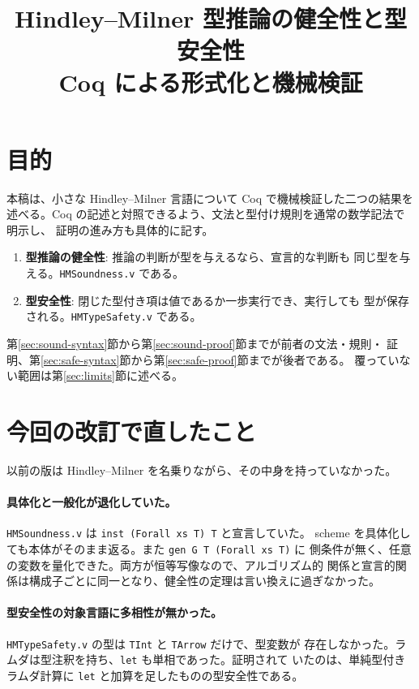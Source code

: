 \documentclass[11pt,a4paper]{ltjsarticle}
\title{Hindley--Milner 型推論の健全性と型安全性\\\large Coq による形式化と機械検証}
\author{}
\date{}
\begin{document}
\maketitle

\section{目的}

本稿は、小さな Hindley--Milner 言語について Coq で機械検証した二つの結果を
述べる。Coq の記述と対照できるよう、文法と型付け規則を通常の数学記法で明示し、
証明の進み方も具体的に記す。

\begin{enumerate}
  \item \textbf{型推論の健全性}: 推論の判断が型を与えるなら、宣言的な判断も
  同じ型を与える。\texttt{HMSoundness.v} である。
  \item \textbf{型安全性}: 閉じた型付き項は値であるか一歩実行でき、実行しても
  型が保存される。\texttt{HMTypeSafety.v} である。
\end{enumerate}

第\ref{sec:sound-syntax}節から第\ref{sec:sound-proof}節までが前者の文法・規則・
証明、第\ref{sec:safe-syntax}節から第\ref{sec:safe-proof}節までが後者である。
覆っていない範囲は第\ref{sec:limits}節に述べる。

\section{今回の改訂で直したこと}

以前の版は Hindley--Milner を名乗りながら、その中身を持っていなかった。

\paragraph{具体化と一般化が退化していた。}
\texttt{HMSoundness.v} は \texttt{inst (Forall xs T) T} と宣言していた。
scheme を具体化しても本体がそのまま返る。また \texttt{gen G T (Forall xs T)} に
側条件が無く、任意の変数を量化できた。両方が恒等写像なので、アルゴリズム的
関係と宣言的関係は構成子ごとに同一となり、健全性の定理は言い換えに過ぎなかった。

\paragraph{型安全性の対象言語に多相性が無かった。}
\texttt{HMTypeSafety.v} の型は \texttt{TInt} と \texttt{TArrow} だけで、型変数が
存在しなかった。ラムダは型注釈を持ち、\texttt{let} も単相であった。証明されて
いたのは、単純型付きラムダ計算に \texttt{let} と加算を足したものの型安全性である。
\end{document}
